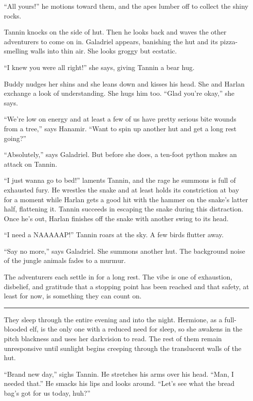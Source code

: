 \documentclass[smalldemyvopaper,11pt,twoside,onecolumn,openright,extrafontsizes]{memoir}
\begin{document}
``All yours!'' he motions toward them, and the apes lumber off to
collect the shiny rocks.

Tannin knocks on the side of hut. Then he looks back and waves the other
adventurers to come on in. Galadriel appears, banishing the hut and its
pizza-smelling walls into thin air. She looks groggy but ecstatic.

``I knew you were all right!'' she says, giving Tannin a bear hug.

Buddy nudges her shins and she leans down and kisses his head. She and
Harlan exchange a look of understanding. She hugs him too. ``Glad you're
okay,'' she says.

``We're low on energy and at least a few of us have pretty serious bite
wounds from a tree,'' says Hanamir. ``Want to spin up another hut and
get a long rest going?''

``Absolutely,'' says Galadriel. But before she does, a ten-foot python
makes an attack on Tannin.

``I just wanna go to bed!'' laments Tannin, and the rage he summons is
full of exhausted fury. He wrestles the snake and at least holds its
constriction at bay for a moment while Harlan gets a good hit with the
hammer on the snake's latter half, flattening it. Tannin succeeds in
escaping the snake during this distraction. Once he's out, Harlan
finishes off the snake with another swing to its head.

``I need a NAAAAAP!'' Tannin roars at the sky. A few birds flutter away.

``Say no more,'' says Galadriel. She summons another hut. The background
noise of the jungle animals fades to a murmur.

The adventurers each settle in for a long rest. The vibe is one of
exhaustion, disbelief, and gratitude that a stopping point has been
reached and that safety, at least for now, is something they can count
on.

\begin{center}\rule{0.5\linewidth}{\linethickness}\end{center}

They sleep through the entire evening and into the night. Hermione, as a
full-blooded elf, is the only one with a reduced need for sleep, so she
awakens in the pitch blackness and uses her darkvision to read. The rest
of them remain unresponsive until sunlight begins creeping through the
translucent walls of the hut.

``Brand new day,'' sighs Tannin. He stretches his arms over his head.
``Man, I needed that.'' He smacks his lips and looks around. ``Let's see
what the bread bag's got for us today, huh?''
\end{document}
